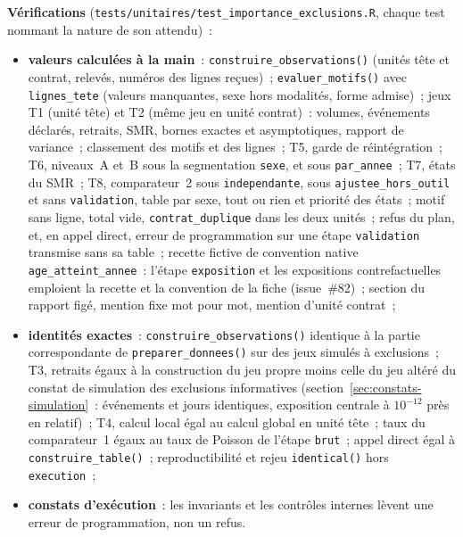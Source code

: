 \documentclass[a4paper,11pt]{article}
\newcommand{\code}[1]{\texttt{\small #1}}
\begin{document}
{\medskip
\noindent
\textbf{Vérifications} (\code{tests/unitaires/test\_importance\_exclusions.R},
chaque test nommant la nature de son attendu)~:
\begin{itemize}[leftmargin=*, itemsep=2pt]
  \item \textbf{valeurs calculées à la main}~: \code{construire\_observations()}
    (unités tête et contrat, relevés, numéros des lignes reçues)~;
    \code{evaluer\_motifs()} avec \code{lignes\_tete} (valeurs manquantes,
    sexe hors modalités, forme admise)~; jeux T1 (unité tête) et T2 (même
    jeu en unité contrat)~: volumes, événements déclarés, retraits, SMR,
    bornes exactes et asymptotiques, rapport de variance~; classement des
    motifs et des lignes~; T5, garde de réintégration~; T6, niveaux~A et~B
    sous la segmentation \code{sexe}, et sous \code{par\_annee}~; T7, états
    du SMR~; T8, comparateur~2 sous \code{independante}, sous
    \code{ajustee\_hors\_outil} et sans \code{validation}, table par sexe,
    tout ou rien et priorité des états~; motif sans ligne, total vide,
    \code{contrat\_duplique} dans les deux unités~; refus du plan, et, en
    appel direct, erreur de programmation sur une étape
    \code{validation} transmise sans sa table~; recette fictive de convention native
    \code{age\_atteint\_annee}~: l'étape \code{exposition} et les
    expositions contrefactuelles emploient la recette et la convention de
    la fiche (issue~\#82)~; section du rapport figé, mention fixe mot pour mot,
    mention d'unité contrat~;
  \item \textbf{identités exactes}~: \code{construire\_observations()}
    identique à la partie correspondante de \code{preparer\_donnees()} sur
    des jeux simulés à exclusions~; T3, retraits égaux à la construction du
    jeu propre moins celle du jeu altéré du constat de simulation des
    exclusions informatives (section~\ref{sec:constats-simulation}~:
    événements et jours identiques, exposition centrale à $10^{-12}$ près en
    relatif)~; T4, calcul local égal au calcul global en unité tête~; taux du
    comparateur~1 égaux au taux de Poisson de l'étape \code{brut}~; appel
    direct égal à \code{construire\_table()}~; reproductibilité et rejeu
    \code{identical()} hors \code{execution}~;
  \item \textbf{constats d'exécution}~: les invariants et les contrôles
    internes lèvent une erreur de programmation, non un refus.
\end{itemize}

}
\end{document}
